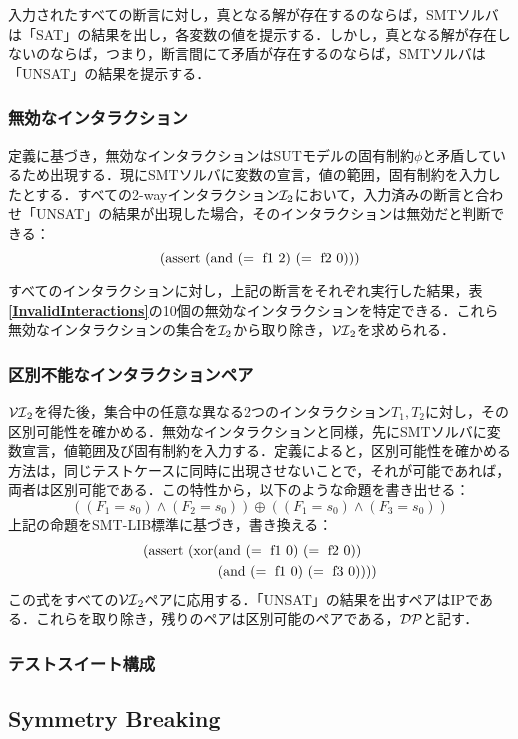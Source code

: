 \documentclass[paper]{ieicej}
\begin{document}
入力されたすべての断言に対し，真となる解が存在するのならば，SMTソルバは「SAT」の結果を出し，各変数の値を提示する．しかし，真となる解が存在しないのならば，つまり，断言間にて矛盾が存在するのならば，SMTソルバは「UNSAT」の結果を提示する．

\subsubsection{無効なインタラクション}
\label{subsec:invalid}
定義に基づき，無効なインタラクションはSUTモデルの固有制約$\phi$と矛盾しているため出現する．現にSMTソルバに変数の宣言，値の範囲，固有制約を入力したとする．すべての2-wayインタラクション${\cal I}_2$において，入力済みの断言と合わせ「UNSAT」の結果が出現した場合，そのインタラクションは無効だと判断できる：
\[{\rm (assert\ (and\ (=\ f1\ 2)\ (=\ f2\ 0)))}\]

すべてのインタラクションに対し，上記の断言をそれぞれ実行した結果，表{\bfseries \ref{InvalidInteractions}}の10個の無効なインタラクションを特定できる．これら無効なインタラクションの集合を${\cal I}_2$から取り除き，${\cal VI}_2$を求められる．

\subsubsection{区別不能なインタラクションペア}
\label{subsec:indistinguishable}
${\cal VI}_2$を得た後，集合中の任意な異なる2つのインタラクション$T_1, T_2$に対し，その区別可能性を確かめる．無効なインタラクションと同様，先にSMTソルバに変数宣言，値範囲及び固有制約を入力する．定義によると，区別可能性を確かめる方法は，同じテストケースに同時に出現させないことで，それが可能であれば，両者は区別可能である．この特性から，以下のような命題を書き出せる：
\[((F_1 = s_0) \land (F_2 = s_0)) \oplus ((F_1 = s_0) \land (F_3 = s_0))\]
上記の命題をSMT-LIB標準に基づき，書き換える：
\begin{eqnarray}
{\rm (assert\ (xor}&{\rm (and\ (=\ f1\ 0)\ (=\ f2\ 0))\ } \nonumber \\
 &{\rm \ (and\ (=\ f1\ 0)\ (=\ f3\ 0))))} \nonumber
\end{eqnarray}
この式をすべての${\cal VI}_2$ペアに応用する．「UNSAT」の結果を出すペアはIPである．これらを取り除き，残りのペアは区別可能のペアである，${\cal DP}$と記す．
\subsubsection{テストスイート構成}
\label{subsec:suiteconstruct}

\subsection{Symmetry Breaking}
\label{subsec:symmetry}
\end{document}

